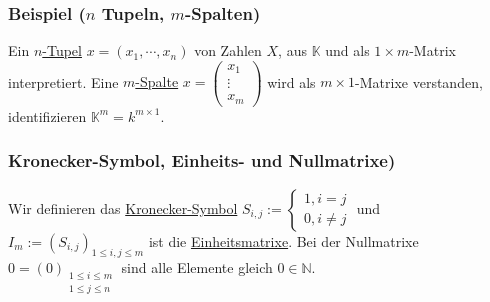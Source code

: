 \subsubsection{Beispiel ($n$ Tupeln, $m$-Spalten)}
Ein \underline{$n$-Tupel} $x=(x_1,\cdots ,x_n)$ von Zahlen $X$, aus $\mathbb{K}$ und als $1\times m$-Matrix interpretiert.  Eine \underline{$m$-Spalte} $x=\left(\begin{array}{c}x_1\\\vdots \\x_m\end{array}\right)$
wird als $m\times 1$-Matrixe verstanden, identifizieren $\mathbb{K}^m=k^{m\times 1}$.
\subsubsection{Kronecker-Symbol, Einheits- und Nullmatrixe)}
Wir definieren das \underline{Kronecker-Symbol} $S_{i,j}:=\begin{cases}1,i=j\\0,i\not= j\end{cases}$ und $I_m:=(S_{i,j})_{1\leq i,j\leq m}$ ist die \underline{Einheitsmatrixe}.  Bei der Nullmatrixe $0=(0)_{\substack{1\leq i\leq m\\1\leq j\leq n}}$ sind alle Elemente gleich $0\in \mathbb{N}$.
